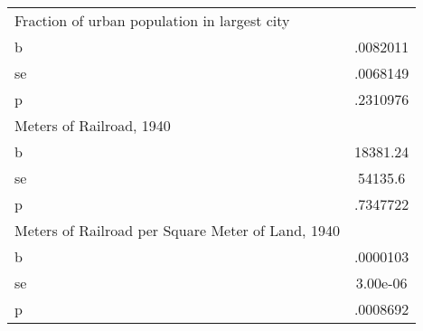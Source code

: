 \begin{tabular}{l*{1}{c}}
\midrule
Fraction of urban population in largest city&         \\
b               & .0082011\\
se              & .0068149\\
p               & .2310976\\
\midrule
Meters of Railroad, 1940&         \\
b               & 18381.24\\
se              &  54135.6\\
p               & .7347722\\
\midrule
Meters of Railroad per Square Meter of Land, 1940&         \\
b               & .0000103\\
se              & 3.00e-06\\
p               & .0008692\\
\bottomrule
\end{tabular}
